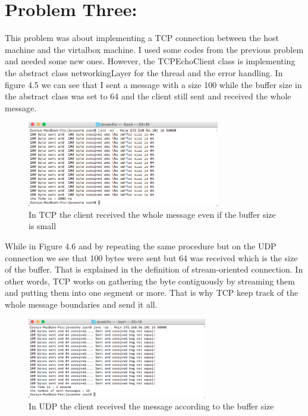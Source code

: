 \documentclass[a4paper,12pt]{article}
\begin{document}
\newpage
\section{Problem Three: }
This problem was about implementing a TCP connection between the host machine and the virtalbox machine. I used some codes from the previous problem and needed some new ones. However, the TCPEchoClient class is implementing the abstract class networkingLayer for the thread and the error handling. 
In figure 4.5 we can see that I sent a message with a size 100 while the buffer size in the abstract class was set to 64 and the client still sent and received the whole message.

\begin{figure}[h]
    \centering
    \includegraphics[width=0.75\textwidth]{figure4}
    \caption{In TCP the client received the whole message even if the  buffer size is small
    }
    \label{}
\end{figure}


While in Figure 4.6 and by repeating the same procedure but on the UDP connection we see that 100 bytes were sent but 64 was received which is the size of the buffer. That is explained in the definition of stream-oriented connection. In other words, TCP works on gathering the byte contiguously by streaming them and putting them into one segment or more. That is why TCP keep track of the whole message boundaries and send it all. 


\begin{figure}[h]
    \centering
    \includegraphics[width=0.70\textwidth, ]{figure5}
    \caption{In UDP the client received the message according to the buffer size}
    \label{}
\end{figure}
\end{document}
